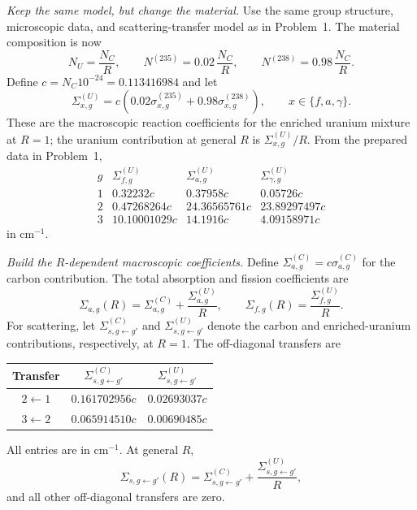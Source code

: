 \begin{adaptedsolution}
\noindent\textit{Keep the same model, but change the material.}
Use the same group structure, microscopic data, and scattering-transfer model
as in Problem~1.  The material composition is now
\[
N_U=\frac{N_C}{R},\qquad
N^{(235)}=0.02\,\frac{N_C}{R},\qquad
N^{(238)}=0.98\,\frac{N_C}{R}.
\]
Define $c=N_C10^{-24}=0.113416984$ and let
\[
\Sigma_{x,g}^{(U)}
=c\left(0.02\sigma_{x,g}^{(235)}+0.98\sigma_{x,g}^{(238)}\right),
\qquad x\in\{f,a,\gamma\}.
\]
These are the macroscopic reaction coefficients for the enriched uranium
mixture at $R=1$; the uranium contribution at general $R$ is
$\Sigma_{x,g}^{(U)}/R$.  From the prepared data in Problem~1,
\[
\begin{array}{c|rrr}
g & \Sigma_{f,g}^{(U)} & \Sigma_{a,g}^{(U)} & \Sigma_{\gamma,g}^{(U)}\\
\hline
1 & 0.32232c & 0.37958c & 0.05726c\\
2 & 0.47268264c & 24.36565761c & 23.89297497c\\
3 & 10.10001029c & 14.1916c & 4.09158971c
\end{array}
\]
in $\mathrm{cm^{-1}}$.

\noindent\textit{Build the $R$-dependent macroscopic coefficients.}
Define $\Sigma_{a,g}^{(C)}=c\sigma_{a,g}^{(C)}$ for the carbon contribution.
The total absorption and fission coefficients are
\[
\Sigma_{a,g}(R)
=\Sigma_{a,g}^{(C)}+\frac{\Sigma_{a,g}^{(U)}}{R},
\qquad
\Sigma_{f,g}(R)=\frac{\Sigma_{f,g}^{(U)}}{R}.
\]
For scattering, let $\Sigma_{s,g\leftarrow g'}^{(C)}$ and
$\Sigma_{s,g\leftarrow g'}^{(U)}$ denote the carbon and enriched-uranium
contributions, respectively, at $R=1$.  The off-diagonal transfers are
\begin{center}
\begin{tabular}{c|cc}
\toprule
Transfer & $\Sigma_{s,g\leftarrow g'}^{(C)}$ &
$\Sigma_{s,g\leftarrow g'}^{(U)}$ \\
\midrule
$2\leftarrow1$ & $0.161702956c$ & $0.02693037c$\\
$3\leftarrow2$ & $0.065914510c$ & $0.00690485c$\\
\bottomrule
\end{tabular}
\end{center}
All entries are in $\mathrm{cm^{-1}}$.  At general $R$,
\[
\Sigma_{s,g\leftarrow g'}(R)
=\Sigma_{s,g\leftarrow g'}^{(C)}
+\frac{\Sigma_{s,g\leftarrow g'}^{(U)}}{R},
\]
and all other off-diagonal transfers are zero.


\end{adaptedsolution}
